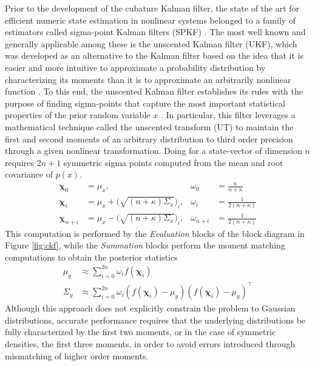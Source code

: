 Prior to the development of the cubature Kalman filter, the state of the art for efficient numeric state estimation in nonlinear systems belonged to a family of estimators called sigma-point Kalman filters (SPKF) \cite{Wan00}. The most well known and generally applicable among these is the unscented Kalman filter (UKF), %
which was developed as an alternative to the Kalman filter based on the idea that it is easier and more intuitive to approximate a probability distribution by characterizing its moments than it is to approximate an arbitrarily nonlinear function \cite{julier98}. To this end, the unscented Kalman filter establishes its rules with the purpose of finding sigma-points that capture the most important statistical properties of the prior random variable $x$ \cite{VanDerMerwe04}. In particular, this filter leverages a mathematical technique called the unscented transform (UT) to maintain the first and second moments of an arbitrary distribution to third order precision through a given nonlinear transformation. Doing for a state-vector of dimension $n$ requires $2n+1$ symmetric sigma points computed from the mean and root covariance of $p(x)$.
\begin{align}
    \mathbf{\chi}_{0} &= \mu_{x}, &\omega_{0} &= \frac{\kappa}{n+\kappa} \\
    \mathbf{\chi}_{i} &= \mu_{x} + \big( \sqrt{(n+\kappa)\Sigma_{x}}\big)_{i}, &\omega_{i} &= \frac{1}{2(n+\kappa)} \\
    \mathbf{\chi}_{n+i} &= \mu_{x} - \big( \sqrt{(n+\kappa)\Sigma_{x}}\big)_{i}, &\omega_{n+i} &= \frac{1}{2(n+\kappa)}
\end{align}
This computation is performed by the \emph{Evaluation} blocks of the block diagram in Figure \ref{fig:ckf}, while the \emph{Summation} blocks perform the moment matching computations to obtain the posterior statistics
\begin{align}
    \mu_{y} &\approx \sum_{i = 0}^{2n} \omega_{i} f(\mathbf{\chi}_{i}) \\
    \Sigma_{y} &\approx \sum_{i = 0}^{2n} \omega_{i} (f(\mathbf{\chi}_{i}) - \mu_{y})(f(\mathbf{\chi}_{i}) - \mu_{y})^{\top}
\end{align}
Although this approach does not explicitly constrain the problem to Gaussian distributions, accurate performance requires that the underlying distributions be fully characterized by the first two moments, or in the case of symmetric densities, the first three moments, in order to avoid errors introduced through mismatching of higher order moments.

